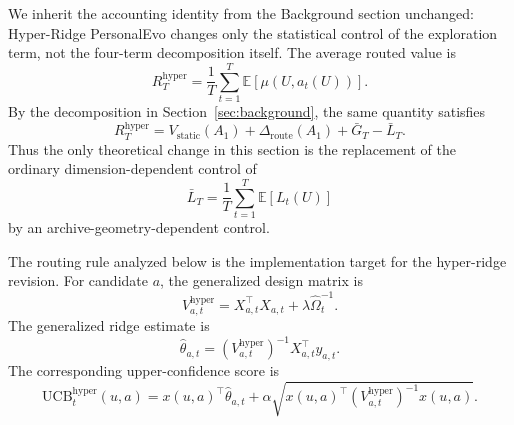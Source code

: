 \documentclass{article} %
\begin{document}
We inherit the accounting identity from the Background section unchanged: Hyper-Ridge PersonalEvo changes only the statistical control of the exploration term, not the four-term decomposition itself. The average routed value is
\begin{equation}
\label{eq:hyper-routed-value}
R_T^{\mathrm{hyper}}
=
\frac{1}{T}\sum_{t=1}^{T}
\mathbb{E}\!\left[\mu(U,a_t(U))\right].
\end{equation}
By the decomposition in Section~\ref{sec:background}, the same quantity satisfies
\begin{equation}
\label{eq:hyper-inherited-decomp}
R_T^{\mathrm{hyper}}
=
V_{\mathrm{static}}(A_1)
+
\Delta_{\mathrm{route}}(A_1)
+
\bar G_T
-
\bar L_T.
\end{equation}
Thus the only theoretical change in this section is the replacement of the ordinary dimension-dependent control of
\begin{equation}
\label{eq:hyper-barl}
\bar L_T
=
\frac{1}{T}\sum_{t=1}^{T}\mathbb{E}[L_t(U)]
\end{equation}
by an archive-geometry-dependent control.

The routing rule analyzed below is the implementation target for the hyper-ridge revision. For candidate \(a\), the generalized design matrix is
\begin{equation}
\label{eq:hyper-design}
V_{a,t}^{\mathrm{hyper}}
=
X_{a,t}^{\top}X_{a,t}
+
\lambda \widehat{\Omega}_t^{-1}.
\end{equation}
The generalized ridge estimate is
\begin{equation}
\label{eq:hyper-theta-hat}
\widehat{\theta}_{a,t}
=
\left(V_{a,t}^{\mathrm{hyper}}\right)^{-1}
X_{a,t}^{\top}y_{a,t}.
\end{equation}
The corresponding upper-confidence score is
\begin{equation}
\label{eq:hyper-ucb}
\mathrm{UCB}_{t}^{\mathrm{hyper}}(u,a)
=
x(u,a)^{\top}\widehat{\theta}_{a,t}
+
\alpha
\sqrt{
x(u,a)^{\top}
\left(V_{a,t}^{\mathrm{hyper}}\right)^{-1}
x(u,a)
}.
\end{equation}
\end{document}
